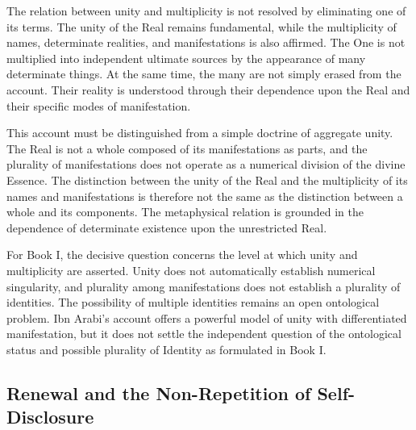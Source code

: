 \label{para:VS.B01.P01.C08.S16.SS11.P001}

The relation between unity and multiplicity is
not resolved by eliminating one of its terms.
The unity of the Real remains fundamental, while
the multiplicity of names, determinate realities,
and manifestations is also affirmed. The One is
not multiplied into independent ultimate sources
by the appearance of many determinate things.
At the same time, the many are not simply erased
from the account. Their reality is understood
through their dependence upon the Real and their
specific modes of manifestation.

\label{para:VS.B01.P01.C08.SS11.P002}

This account must be distinguished from a simple
doctrine of aggregate unity. The Real is not a
whole composed of its manifestations as parts,
and the plurality of manifestations does not
operate as a numerical division of the divine
Essence. The distinction between the unity of
the Real and the multiplicity of its names and
manifestations is therefore not the same as the
distinction between a whole and its components.
The metaphysical relation is grounded in the
dependence of determinate existence upon the
unrestricted Real.

\label{para:VS.B01.P01.C08.S16.SS11.P003}

For Book I, the decisive question concerns the
level at which unity and multiplicity are asserted.
Unity does not automatically establish numerical
singularity, and plurality among manifestations
does not establish a plurality of identities.
The possibility of multiple identities remains
an open ontological problem. Ibn Arabi's account
offers a powerful model of unity with differentiated
manifestation, but it does not settle the independent
question of the ontological status and possible
plurality of Identity as formulated in Book I.



\subsection{Renewal and the Non-Repetition of Self-Disclosure}
\label{subsec:ch08_s16_ss12}

